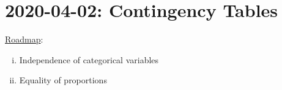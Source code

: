 \section{2020-04-02: Contingency Tables}
\underline{Roadmap}:
\begin{enumerate}[(i)]
    \item Independence of categorical variables
    \item Equality of proportions
\end{enumerate}
